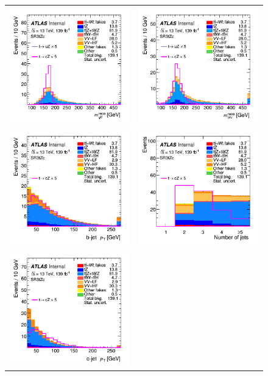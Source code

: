 \begin{figure}[]
	\centering
	\begin{tabular}{cc}
		\includegraphics[width=.35\textwidth]{Appendices/AP5/figures/SR3_UsingDL1rc/tFCNC} &
		\includegraphics[width=.35\textwidth]{Appendices/AP5/figures/SR3_UsingDL1rc/tSM} \\
		\includegraphics[width=.35\textwidth]{Appendices/AP5/figures/SR3_UsingDL1rc/b_pt} & 
		\includegraphics[width=.35\textwidth]{Appendices/AP5/figures/SR3_UsingDL1rc/nJets} \\
		\includegraphics[width=.35\textwidth]{Appendices/AP5/figures/SR3_UsingDL1rc/q_pt}&

\end{tabular}
\end{figure}
